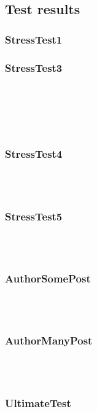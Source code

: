 \begin{description}
\subsection{Test results}

\subsubsection{StressTest1}


\subsubsection{StressTest3}
\\
\\
\\
\\


\subsubsection{StressTest4}
\\
\\


\subsubsection{StressTest5}
\\
\\


\subsubsection{AuthorSomePost}
\\
\\


\subsubsection{AuthorManyPost}
\\
\\


\subsubsection{UltimateTest}
\\
\\
\\

\end{description}

